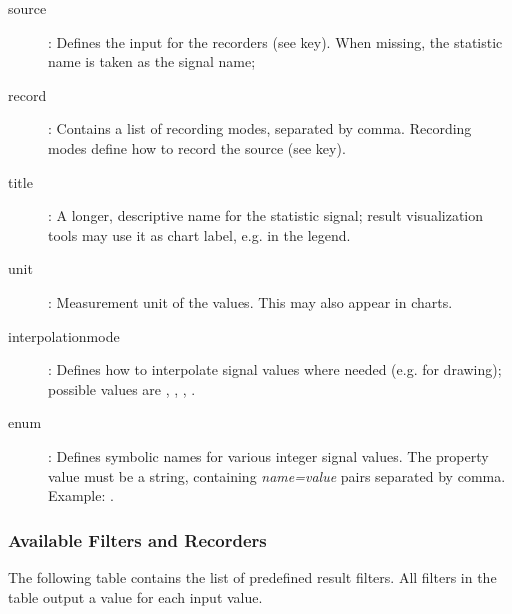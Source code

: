 \begin{description}
  \item[source]: Defines the input for the recorders (see  key).
     When missing, the statistic name is taken as the signal name;
  \item[record]: Contains a list of recording modes, separated by comma.
     Recording modes define how to record the source (see  key).
  \item[title]: A longer, descriptive name for the statistic signal; result
      visualization tools may use it as chart label, e.g. in the legend.
  \item[unit]: Measurement unit of the values. This may also appear in charts.
  \item[interpolationmode]: Defines how to interpolate signal values where
      needed (e.g. for drawing); possible values are ,
      , , .
  \item[enum]: Defines symbolic names for various integer signal values.
      The property value must be a string, containing \textit{name=value} pairs
      separated by comma. Example: .
\end{description}


\subsubsection{Available Filters and Recorders}
\label{sec:simple-modules:available-result-filters-and-recorders}

The following table contains the list of predefined result filters.
All filters in the table output a value for each input value.

